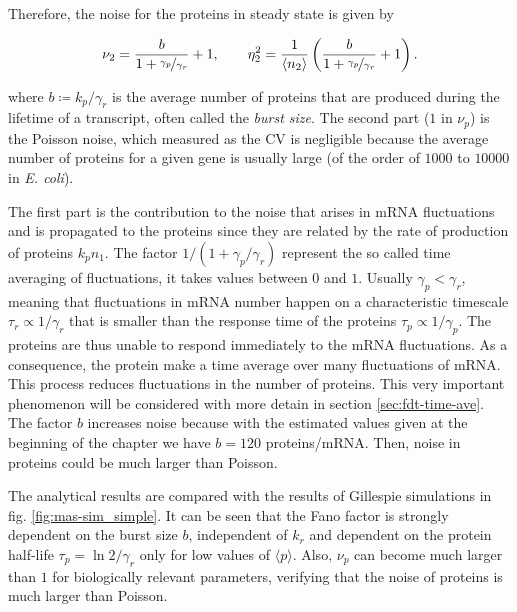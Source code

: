 Therefore, the noise for the proteins in steady state is given by

\begin{equation}
  \label{eq:noise2}
  \nu_2 = \frac{b}{1+\nicefrac{\gamma_p}{\gamma_r}}+1, \quad \quad \eta_2^2 = \frac{1}{\langle n_2\rangle}\left(\frac{b}{1+\nicefrac{\gamma_p}{\gamma_r}}+1\right).
\end{equation}

where $b\coloneqq k_p/\gamma_r$ is the average number of proteins that are produced during the lifetime of a transcript, often called the \textit{burst size}. The second part ($1$ in $\nu_p$) is the Poisson noise, which measured as the CV is negligible because the average number of proteins for a given gene is usually large (of the order of $1000$ to $10000$ in \textit{E. coli}).

The first part is the contribution to the noise that arises in mRNA fluctuations and is propagated to the proteins since they are related by the rate of production of proteins $k_pn_1$. The factor $1/(1+\gamma_p/\gamma_r)$ represent the so called time averaging of fluctuations, it takes values between $0$ and $1$. Usually $\gamma_p<\gamma_r$, meaning that fluctuations in mRNA number happen on a characteristic timescale $\tau_r \propto 1/\gamma_r$  that is smaller than the response time of the proteins $\tau_p \propto 1/\gamma_p$. The proteins are thus unable to respond immediately to the mRNA fluctuations. As a consequence, the protein make a time average over many  fluctuations of mRNA. This process reduces fluctuations in the number of proteins. This very important phenomenon will be considered with more detain in section \ref{sec:fdt-time-ave}. The factor $b$ increases noise because with the estimated values given at the beginning of the chapter we have $b=120$ proteins/mRNA. Then, noise in proteins could be much larger than Poisson.

The analytical results are compared with the results of Gillespie simulations in fig. \ref{fig:mas-sim_simple}. It can be seen that the Fano factor is strongly dependent on the burst size $b$, independent of $k_r$ and dependent on the protein half-life $\tau_p = \ln2/\gamma_r$ only for low values of $\langle p\rangle$. Also, $\nu_p$ can become much larger than $1$ for biologically relevant parameters, verifying that the noise of proteins is much larger than Poisson.

